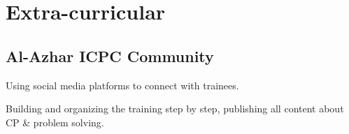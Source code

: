 \documentclass[]{deedy-resume-openfont}
\begin{document}
\begin{minipage}[t]{0.33\textwidth}

\section{Extra-curricular}
\subsection{Al-Azhar ICPC Community}
\begin{tightemize}
    \item Using social media platforms to connect with trainees.\\
    \item Building and organizing the training step by step, publishing all content about CP \& problem solving.
\end{tightemize}
\sectionsep


%
%

\end{minipage} 
\hfill
\end{document}
